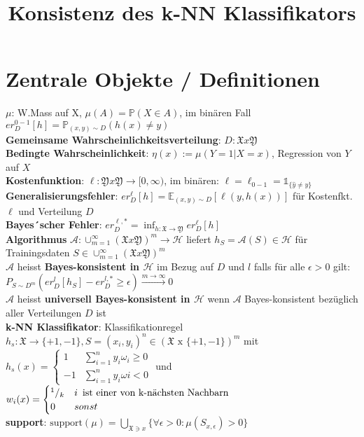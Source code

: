 \documentclass[a4paper,oneside,DIV8,10pt]{scrartcl}
\title{Konsistenz des k-NN Klassifikators\vspace{-2ex}}
\date{}
\begin{document}
\maketitle

\section{Zentrale Objekte / Definitionen}

$\mu$: W.Mass auf X, $\mu(A) = \mathbb{P}(X \in A)$, im bin\"aren Fall $er^{0-1}_{D}[h] = \mathbb{P}_{(x,y) \sim D} (h(x) \neq y)$
\\
\onehalfspacing \textbf{Gemeinsame Wahrscheinlichkeitsverteilung}: $D: \mathfrak{X} x \mathfrak{Y}$ 
\\ \textbf{Bedingte Wahrscheinlichkeit}: $\eta (x) := \mu(Y=1 | X=x)$, Regression von $Y$ auf $X$
\\
\onehalfspacing \textbf{Kostenfunktion}: $\ell:\mathfrak{Y} x \mathfrak{Y} \to [0, \infty)$, im bin\"aren: $\ell=\ell_{0-1} = \mathds{1}_{\{\hat{y} \neq y\}}$
\\
\onehalfspacing \textbf{Generalisierungsfehler}: $er^{\ell}_{D}[h] = \mathbb{E}_{(x,y) \sim D}[\ell(y, h(x))]$ f\"ur Kostenfkt. $\ell$ und Verteilung $D$
\\
\onehalfspacing \textbf{Bayes´scher Fehler}: $er^{\ell,*}_D = \inf_{h: \mathfrak{X} \to \mathfrak{Y}} er^{\ell}_D[h]$
\\
\onehalfspacing \textbf{Algorithmus} $\mathscr{A}: \cup_{m=1}^{\infty} (\mathfrak{X} x \mathfrak{Y})^{m} \to \mathcal{H}$ liefert $h_{S} = \mathscr{A}(S) \in \mathcal{H}$ f\"ur Trainingsdaten $S \in \cup_{m=1}^{\infty} (\mathfrak{X} x \mathfrak{Y})^{m}$
\\
\onehalfspacing $\mathscr{A}$ heisst \textbf{Bayes-konsistent in $\mathcal{H}$} im Bezug auf $D$ und $l$ falls f\"ur alle $\epsilon > 0$ gilt:
	$P_{S \sim D^{m}}(er^{l}_{D}[h_{S}] - er^{l,*}_D \geq \epsilon) \stackrel{m \to \infty}{\longrightarrow} 0$
\\
\onehalfspacing $\mathscr{A}$ heisst \textbf{universell Bayes-konsistent in $\mathcal{H}$} wenn $\mathscr{A}$ Bayes-konsistent bez\"uglich aller Verteilungen $D$ ist
\\
\onehalfspacing
\textbf{k-NN Klassifikator}:
Klassifikationregel $h_{s}: \mathfrak{X} \to \{+1,-1\}, S =(x_{i}, y_{i})^{n} \in (\mathfrak{X} \text{ x }\{+1, -1\})^{m}$ mit
	\\ $h_{s}(x) =
		 \begin{cases} 1 & \sum_{i=1}^{n} y_{i} \omega_{i} \geq 0  \\
			-1 & \sum_{i=1}^{n} y_{i} \omega{i} < 0  \end{cases}$
		und 
	\\ $w_{i}(x) =
		 \begin{cases} ^1/_k & i \enskip \text{ist einer von k-n\"achsten Nachbarn} \\
			0 & sonst \end{cases} $
\\
\onehalfspacing \textbf{support}: $\text{support}(\mu) = \bigcup_{\mathfrak{X} \ni x} \{ \forall \epsilon > 0: \mu(S_{x, \epsilon}) > 0\}$
\end{document}
